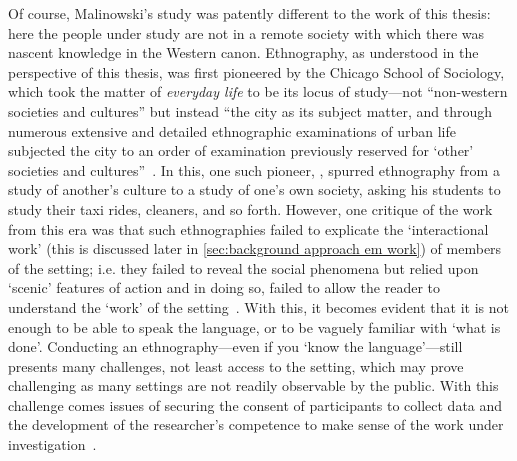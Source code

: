 \begin{revisedsubmission}
Of course, Malinowski's study was patently different to the work of this thesis: here the people under study are not in a remote society with which there was nascent knowledge in the Western canon.
Ethnography, as understood in the perspective of this thesis, was first pioneered by the Chicago School of Sociology, which took the matter of \textit{everyday life} to be its locus of study---not ``non-western societies and cultures'' but instead ``the city as its subject matter, and through numerous extensive and detailed ethnographic examinations of urban life subjected the city to an order of examination previously reserved for ‘other’ societies and cultures''~\citep[p. 112]{Button2015}.
In this, one such pioneer, \citet{Hughes1958}, spurred ethnography from a study of another's culture to a study of one's own society, asking his students to study their taxi rides, cleaners, and so forth.
However, one critique of the work from this era was that such ethnographies failed to explicate the `interactional work' (this is discussed later in \ref{sec:background approach em work}) of members of the setting; i.e. they failed to reveal the social phenomena but relied upon `scenic' features of action and in doing so, failed to allow the reader to understand the `work' of the setting~\citep{Crabtree2009}.
With this, it becomes evident that it is not enough to be able to speak the language, or to be vaguely familiar with `what is done'.
Conducting an ethnography---even if you `know the language'---still presents many challenges, not least access to the setting, which may prove challenging as many settings are not readily observable by the public.
With this challenge comes issues of securing the consent of participants to collect data and the development of the researcher's competence to make sense of the work under investigation~\citep[pp. 89--95]{Crabtree2012}.


\end{revisedsubmission}
